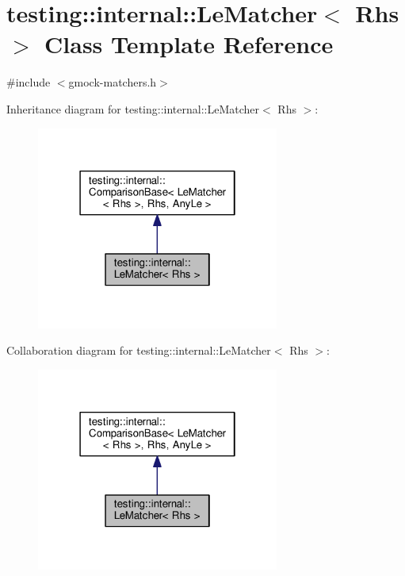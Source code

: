 \hypertarget{classtesting_1_1internal_1_1_le_matcher}{}\section{testing\+:\+:internal\+:\+:Le\+Matcher$<$ Rhs $>$ Class Template Reference}
\label{classtesting_1_1internal_1_1_le_matcher}


{\ttfamily \#include $<$gmock-\/matchers.\+h$>$}



Inheritance diagram for testing\+:\+:internal\+:\+:Le\+Matcher$<$ Rhs $>$\+:
\nopagebreak
\begin{figure}[H]
\begin{center}
\leavevmode
\includegraphics[width=226pt]{classtesting_1_1internal_1_1_le_matcher__inherit__graph}
\end{center}
\end{figure}


Collaboration diagram for testing\+:\+:internal\+:\+:Le\+Matcher$<$ Rhs $>$\+:
\nopagebreak
\begin{figure}[H]
\begin{center}
\leavevmode
\includegraphics[width=226pt]{classtesting_1_1internal_1_1_le_matcher__coll__graph}
\end{center}
\end{figure}
